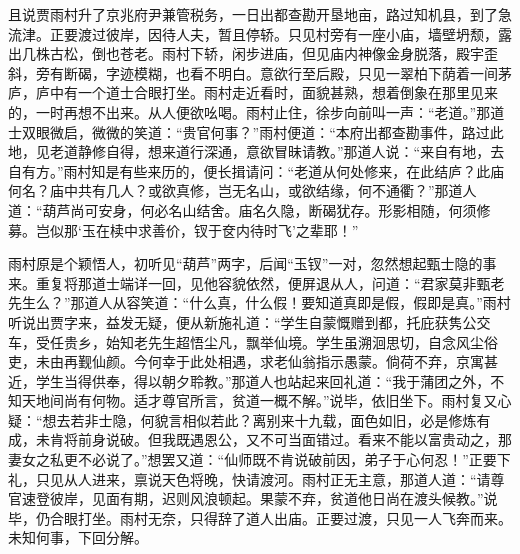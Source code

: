 \begin{parag}
    且说贾雨村升了京兆府尹兼管税务，一日出都查勘开垦地亩，路过知机县，到了急流津。正要渡过彼岸，因待人夫，暂且停轿。只见村旁有一座小庙，墙壁坍颓，露出几株古松，倒也苍老。雨村下轿，闲步进庙，但见庙内神像金身脱落，殿宇歪斜，旁有断碣，字迹模糊，也看不明白。意欲行至后殿，只见一翠柏下荫着一间茅庐，庐中有一个道士合眼打坐。雨村走近看时，面貌甚熟，想着倒象在那里见来的，一时再想不出来。从人便欲吆喝。雨村止住，徐步向前叫一声：“老道。”那道士双眼微启，微微的笑道：“贵官何事？”雨村便道：“本府出都查勘事件，路过此地，见老道静修自得，想来道行深通，意欲冒昧请教。”那道人说：“来自有地，去自有方。”雨村知是有些来历的，便长揖请问：“老道从何处修来，在此结庐？此庙何名？庙中共有几人？或欲真修，岂无名山，或欲结缘，何不通衢？”那道人道：“葫芦尚可安身，何必名山结舍。庙名久隐，断碣犹存。形影相随，何须修募。岂似那‘玉在椟中求善价，钗于奁内待时飞’之辈耶！”
\end{parag}


\begin{parag}
    雨村原是个颖悟人，初听见“葫芦”两字，后闻“玉钗”一对，忽然想起甄士隐的事来。重复将那道士端详一回，见他容貌依然，便屏退从人，问道：“君家莫非甄老先生么？”那道人从容笑道：“什么真，什么假！要知道真即是假，假即是真。”雨村听说出贾字来，益发无疑，便从新施礼道：“学生自蒙慨赠到都，托庇获隽公交车，受任贵乡，始知老先生超悟尘凡，飘举仙境。学生虽溯洄思切，自念风尘俗吏，未由再觐仙颜。今何幸于此处相遇，求老仙翁指示愚蒙。倘荷不弃，京寓甚近，学生当得供奉，得以朝夕聆教。”那道人也站起来回礼道：“我于蒲团之外，不知天地间尚有何物。适才尊官所言，贫道一概不解。”说毕，依旧坐下。雨村复又心疑：“想去若非士隐，何貌言相似若此？离别来十九载，面色如旧，必是修炼有成，未肯将前身说破。但我既遇恩公，又不可当面错过。看来不能以富贵动之，那妻女之私更不必说了。”想罢又道：“仙师既不肯说破前因，弟子于心何忍！”正要下礼，只见从人进来，禀说天色将晚，快请渡河。雨村正无主意，那道人道：“请尊官速登彼岸，见面有期，迟则风浪顿起。果蒙不弃，贫道他日尚在渡头候教。”说毕，仍合眼打坐。雨村无奈，只得辞了道人出庙。正要过渡，只见一人飞奔而来。未知何事，下回分解。
\end{parag}